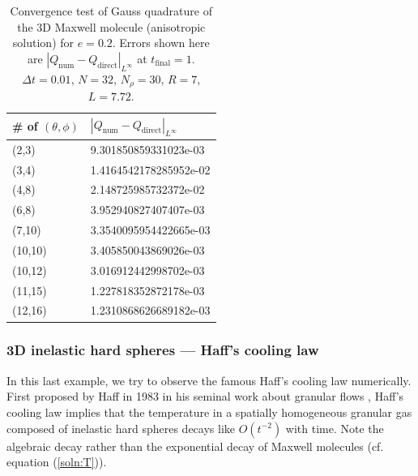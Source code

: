 \documentclass[review,times]{elsarticle}
\begin{document}
\begin{table}[htpb]
  \color{blue}
  \centering
  \begin{tabu} to 0.8\linewidth {X[1,c] X[2,c]}
    \toprule
    \# of $(\theta, \phi)$ & $|Q_\text{num} - Q_\text{direct}|_{L^{\infty}}$\\
    \midrule
    (2,3) & 9.301850859331023e-03 \\
    (3,4) & 1.4164542178285952e-02 \\
    (4,8) & 2.148725985732372e-02 \\
    (6,8) & 3.952940827407407e-03 \\
    (7,10) & 3.3540095954422665e-03 \\
    (10,10) & 3.405850043869026e-03 \\
    (10,12) & 3.016912442998702e-03 \\
    (11,15) & 1.227818352872178e-03 \\
    (12,16) & 1.2310868626689182e-03 \\
    \bottomrule
  \end{tabu}
  \caption{\color{blue} Convergence test of Gauss quadrature of the 3D Maxwell molecule (anisotropic solution) for $e=0.2$. Errors shown here are $|Q_\text{num} - Q_\text{direct}|_{L^{\infty}}$ at $t_\text{final}=1$. $\Delta t = 0.01$, $N = 32$, $N_{\rho}=30$, $R=7$, $L=7.72$.}
  \label{3D_quadrature_conv_anisotropic}
\end{table}


\subsubsection{3D inelastic hard spheres --- Haff's cooling law}

In this last example, we try to observe the famous Haff's cooling law numerically. First proposed by Haff in 1983 in his seminal work about granular flows \cite{Haff83}, Haff's cooling law implies that the temperature in a spatially homogeneous granular gas composed of inelastic hard spheres decays like $O(t^{-2})$ with time. Note the algebraic decay rather than the exponential decay of Maxwell molecules (cf. equation (\ref{soln:T})).
\end{document}
